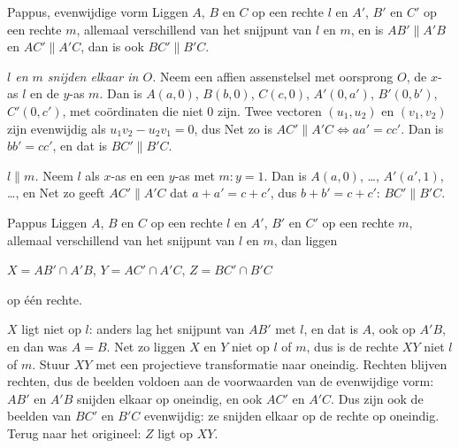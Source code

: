 \begin{theorie}
\begin{stelling}{Pappus, evenwijdige vorm}
Liggen $A$, $B$ en $C$ op een rechte $l$ en $A'$, $B'$ en $C'$ op een rechte $m$, allemaal verschillend van het snijpunt van $l$ en $m$, en is $AB' \parallel A'B$ en $AC' \parallel A'C$, dan is ook $BC' \parallel B'C$.
\end{stelling}

\begin{bewijs}
\textit{$l$ en $m$ snijden elkaar in $O$.} Neem een affien assenstelsel met oorsprong $O$, de $x$-as $l$ en de $y$-as $m$. Dan is $A(a, 0)$, $B(b, 0)$, $C(c, 0)$, $A'(0, a')$, $B'(0, b')$, $C'(0, c')$, met coördinaten die niet 0 zijn. Twee vectoren $(u_1, u_2)$ en $(v_1, v_2)$ zijn evenwijdig als $u_1v_2 - u_2v_1 = 0$, dus
Net zo is $AC' \parallel A'C \iff aa' = cc'$. Dan is $bb' = cc'$, en dat is $BC' \parallel B'C$.

\textit{$l \parallel m$.} Neem $l$ als $x$-as en een $y$-as met $m: y = 1$. Dan is $A(a, 0)$, \dots, $A'(a', 1)$, \dots, en
Net zo geeft $AC' \parallel A'C$ dat $a + a' = c + c'$, dus $b + b' = c + c'$: $BC' \parallel B'C$.
\end{bewijs}
\end{theorie}

\begin{theorie}
\begin{stelling}{Pappus}
Liggen $A$, $B$ en $C$ op een rechte $l$ en $A'$, $B'$ en $C'$ op een rechte $m$, allemaal verschillend van het snijpunt van $l$ en $m$, dan liggen

\vspace{1mm}
\qquad $X = AB' \cap A'B$, \quad $Y = AC' \cap A'C$, \quad $Z = BC' \cap B'C$

\vspace{1mm}
op één rechte.
\end{stelling}

\begin{bewijs}
$X$ ligt niet op $l$: anders lag het snijpunt van $AB'$ met $l$, en dat is $A$, ook op $A'B$, en dan was $A = B$. Net zo liggen $X$ en $Y$ niet op $l$ of $m$, dus is de rechte $XY$ niet $l$ of $m$. Stuur $XY$ met een projectieve transformatie naar oneindig. Rechten blijven rechten, dus de beelden voldoen aan de voorwaarden van de evenwijdige vorm: $AB'$ en $A'B$ snijden elkaar op oneindig, en ook $AC'$ en $A'C$. Dus zijn ook de beelden van $BC'$ en $B'C$ evenwijdig: ze snijden elkaar op de rechte op oneindig. Terug naar het origineel: $Z$ ligt op $XY$.
\end{bewijs}
\end{theorie}

